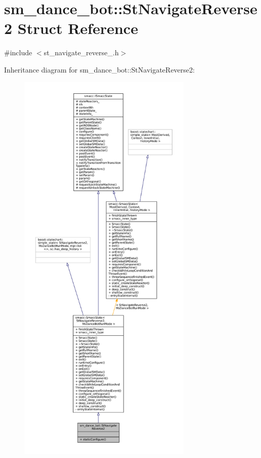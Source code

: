 \hypertarget{structsm__dance__bot_1_1StNavigateReverse2}{}\section{sm\+\_\+dance\+\_\+bot\+:\+:St\+Navigate\+Reverse2 Struct Reference}
\label{structsm__dance__bot_1_1StNavigateReverse2}


{\ttfamily \#include $<$st\+\_\+navigate\+\_\+reverse\+\_.\+h$>$}



Inheritance diagram for sm\+\_\+dance\+\_\+bot\+:\+:St\+Navigate\+Reverse2\+:
\nopagebreak
\begin{figure}[H]
\begin{center}
\leavevmode
\includegraphics[height=550pt]{structsm__dance__bot_1_1StNavigateReverse2__inherit__graph}
\end{center}
\end{figure}


